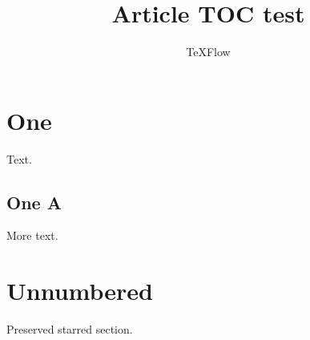 \documentclass{article}
\title{Article TOC test}
\author{TeXFlow}
\begin{document}
\maketitle
\tableofcontents
\section{One}
Text.
\subsection{One A}
More text.
\section*{Unnumbered}
Preserved starred section.
\end{document}
